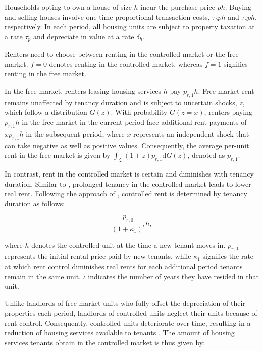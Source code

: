 \documentclass[parskip=full]{article}
\begin{document}
Households opting to own a house of size $h$ incur the purchase price $p h$. Buying and selling houses involve one-time proportional transaction costs, $\tau_{b} p h$ and $\tau_{s} p h$, respectively. In each period, all housing units are subject to property taxation at a rate $\tau_{p}$ and depreciate in value at a rate $\delta_h$.

Renters need to choose between renting in the controlled market or the free market. $f=0$ denotes renting in the controlled market, whereas $f=1$ signifies renting in the free market.

In the free market, renters leasing housing services $h$ pay $p_{r,1} h$. Free market rent remains unaffected by tenancy duration and is subject to uncertain shocks, $z$, which follow a distribution $G(z)$. With probability $G(z=x)$, renters paying $p_{r,1}h$ in the free market in the current period face additional rent payments of $x p_{r,1}h$ in the subsequent period, where $x$ represents an independent shock that can take negative as well as positive values. Consequently, the average per-unit rent in the free market is given by $\int_\mathcal{Z}(1+z)p_{r,1}\mathrm{d}G(z)$, denoted as $\overline{p}_{r,1}$.

In contrast, rent in the controlled market is certain and diminishes with tenancy duration. Similar to \citet{fmn-2023}, prolonged tenancy in the controlled market leads to lower real rent. Following the approach of \citet{fmn-2023}, controlled rent is determined by tenancy duration as follows:

\begin{equation}\label{eq:rent_in_controlled_market}
\frac{p_{r,0}}{(1+\kappa_{1})^{\iota}} h,
\end{equation} 

\noindent where $h$ denotes the controlled unit at the time a new tenant moves in. $p_{r,0}$ represents the initial rental price paid by new tenants, while $\kappa_{1}$ signifies the rate at which rent control diminishes real rents for each additional period tenants remain in the same unit. $\iota$ indicates the number of years they have resided in that unit.

Unlike landlords of free market units who fully offset the depreciation of their properties each period, landlords of controlled units neglect their units because of rent control. Consequently, controlled units deteriorate over time, resulting in a reduction of housing services available to tenants \citep{gl-1990,la-2018}. The amount of housing services tenants obtain in the controlled market is thus given by:
\end{document}
